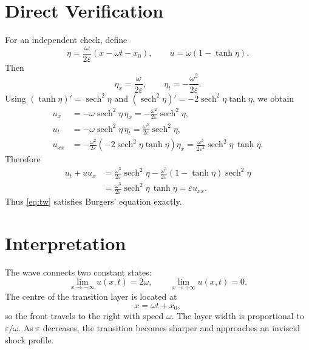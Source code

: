 \documentclass[11pt]{article}
\newcommand{\sech}{\operatorname{sech}}
\begin{document}
\section{Direct Verification}

For an independent check, define
\begin{equation}
    \eta=\frac{\omega}{2\varepsilon}(x-\omega t-x_0),
    \qquad
    u=\omega(1-\tanh\eta).
\end{equation}
Then
\begin{equation}
    \eta_x=\frac{\omega}{2\varepsilon},
    \qquad
    \eta_t=-\frac{\omega^2}{2\varepsilon}.
\end{equation}
Using $(\tanh\eta)'=\sech^2\eta$ and
$(\sech^2\eta)'=-2\sech^2\eta\tanh\eta$, we obtain
\begin{align}
    u_x
    &=
    -\omega\sech^2\eta\,\eta_x
    =
    -\frac{\omega^2}{2\varepsilon}\sech^2\eta,
    \\
    u_t
    &=
    -\omega\sech^2\eta\,\eta_t
    =
    \frac{\omega^3}{2\varepsilon}\sech^2\eta,
    \\
    u_{xx}
    &=
    -\frac{\omega^2}{2\varepsilon}
    \left(-2\sech^2\eta\tanh\eta\right)\eta_x
    =
    \frac{\omega^3}{2\varepsilon^2}
    \sech^2\eta\,\tanh\eta.
\end{align}
Therefore
\begin{align}
    u_t+u u_x
    &=
    \frac{\omega^3}{2\varepsilon}\sech^2\eta
    -
    \frac{\omega^3}{2\varepsilon}(1-\tanh\eta)\sech^2\eta
    \\
    &=
    \frac{\omega^3}{2\varepsilon}
    \sech^2\eta\,\tanh\eta
    =
    \varepsilon u_{xx}.
\end{align}
Thus \eqref{eq:tw} satisfies Burgers' equation exactly.

\section{Interpretation}

The wave connects two constant states:
\begin{equation}
    \lim_{x\to-\infty}u(x,t)=2\omega,
    \qquad
    \lim_{x\to+\infty}u(x,t)=0.
\end{equation}
The centre of the transition layer is located at
\begin{equation}
    x=\omega t+x_0,
\end{equation}
so the front travels to the right with speed $\omega$.  The layer width is
proportional to $\varepsilon/\omega$.  As $\varepsilon$ decreases, the transition
becomes sharper and approaches an inviscid shock profile.
\end{document}
